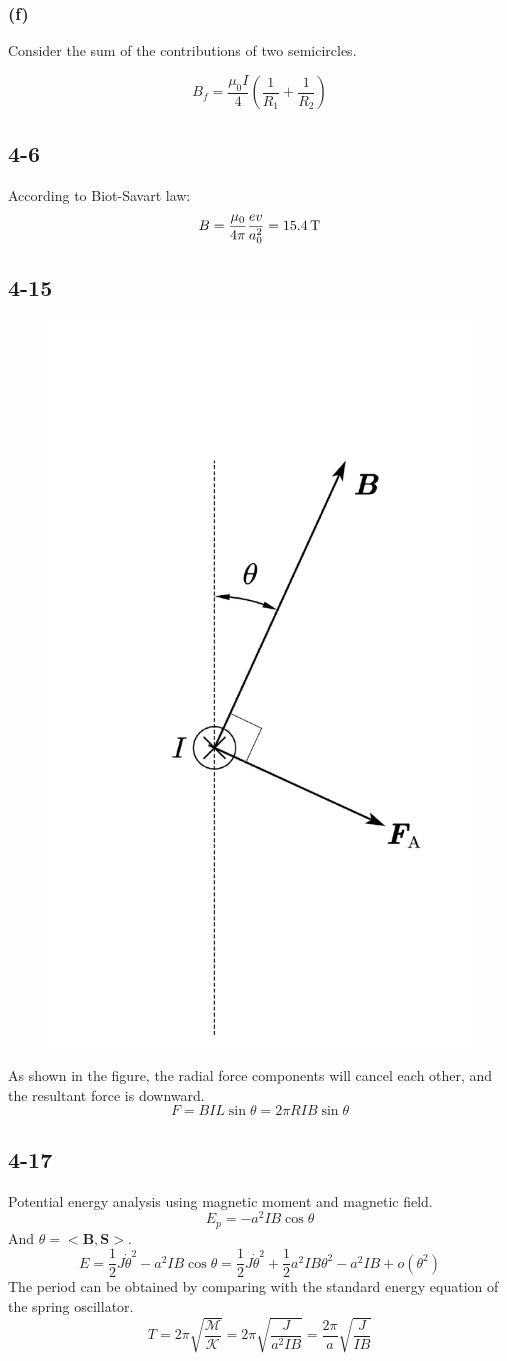 \documentclass[a4paper,11pt]{amsart}
\theoremstyle{definition}
\begin{document}
	\subsubsection*{(f)}
	Consider the sum of the contributions of two semicircles.
	
	$$
	B_f=\frac{\mu _0I}{4}\left( \frac{1}{R_1}+\frac{1}{R_2} \right) 
	$$
	\subsection*{4-6}
	According to Biot-Savart law:
	$$
	B=\frac{\mu _0}{4\pi}\frac{ev}{a_{0}^{2}}=15.4\thinspace\mathrm{T}
	$$
	
	\subsection*{4-15}
	\begin{figure}
		\centering
		\includegraphics[width=0.3\linewidth]{4-17}
		\caption*{}
		\label{fig:4-17}
	\end{figure}
	As shown in the figure, the radial force components will cancel each other, and the resultant force is downward.
	$$
	F=BIL\sin\theta=2\pi RIB\sin\theta
	$$
	
	\subsection*{4-17}
	Potential energy analysis using magnetic moment and magnetic field.
	$$
	E_p=-a^2IB\cos \theta 
	$$
	And $\theta = <\bm{B}, \bm{S}>.$
	$$
	E=\frac{1}{2}J\dot{\theta}^2-a^2IB\cos \theta =\frac{1}{2}J\dot{\theta}^2+\frac{1}{2}a^2IB\theta ^2-a^2IB+o\left( \theta ^2 \right) 	
	$$
	The period can be obtained by comparing with the standard energy equation of the spring oscillator.
	$$
	T=2\pi \sqrt{\frac{\mathcal{M}}{\mathcal{K}}}=2\pi \sqrt{\frac{J}{a^2IB}}=\frac{2\pi}{a}\sqrt{\frac{J}{IB}}
	$$
	
\end{document}
